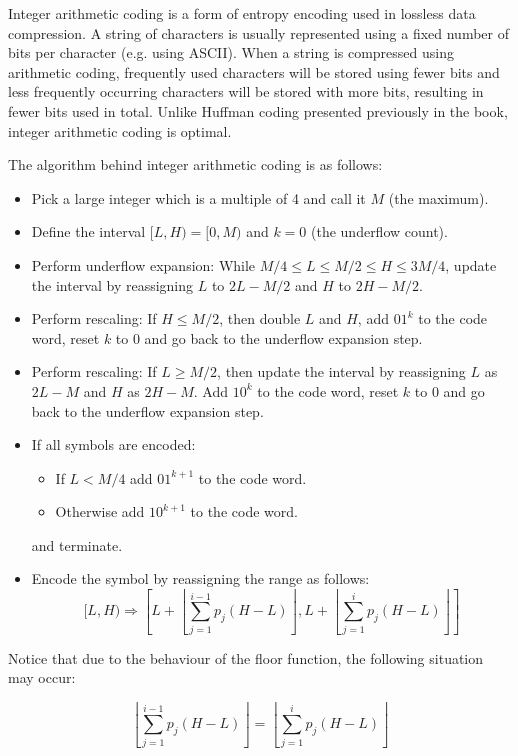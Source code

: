 Integer arithmetic coding is a form of entropy encoding used in lossless data compression. A string of characters is usually represented using a fixed number of bits per character (e.g. using ASCII). When a string is compressed using arithmetic coding, frequently used characters will be stored using fewer bits and less frequently occurring characters will be stored with more bits, resulting in fewer bits used in total. Unlike Huffman coding presented previously in the book, integer arithmetic coding is optimal.

The algorithm behind integer arithmetic coding is as follows:

\begin{itemize}
  \item Pick a large integer which is a multiple of 4 and call it $M$ (the maximum).
  \item Define the interval $[L, H) = [0, M)$ and $k=0$ (the underflow count).
  \item Perform underflow expansion: While $M/4 \leq L \leq M/2 \leq H \leq 3M/4$, update the interval by reassigning $L$ to $2L-M/2$ and $H$ to $2H-M/2$.
  \item Perform rescaling: If $H \le M/2$, then double $L$ and $H$, add $01^k$ to the code word, reset $k$ to 0 and go back to the underflow expansion step.
  \item Perform rescaling: If $L \ge M/2$, then update the interval by reassigning $L$ as $2L-M$ and $H$ as $2H-M$. Add $10^k$ to the code word, reset $k$ to 0 and go back to the underflow expansion step.
  \item If all symbols are encoded:
  \begin{itemize}
    \item If $L < M/4$ add $01^{k+1}$ to the code word.
    \item Otherwise add $10^{k+1}$ to the code word.
  \end{itemize}
  and terminate.
  \item Encode the symbol by reassigning the range as follows:
  $$
  [L, H) \Rightarrow \left[L+\left\lfloor\sum_{j=1}^{i-1} p_j(H-L)\right\rfloor, L+\left\lfloor\sum_{j=1}^{i} p_j(H-L)\right\rfloor\right]
  $$
\end{itemize}

Notice that due to the behaviour of the floor function, the following situation may occur:

$$
\left\lfloor\sum_{j=1}^{i-1} p_j(H-L)\right\rfloor = \left\lfloor\sum_{j=1}^{i} p_j(H-L)\right\rfloor
$$

